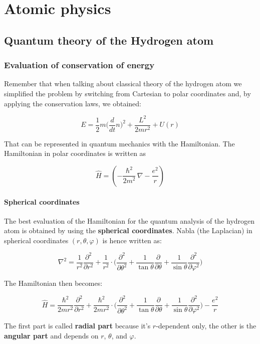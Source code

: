 \graphicspath{{chapters/06/}}
\chapter{Atomic physics}

\section{Quantum theory of the Hydrogen atom}

	\subsection{Evaluation of conservation of energy}
	Remember that when talking about classical theory of the hydrogen atom we simplified the problem by switching from Cartesian to polar coordinates and, by applying the conservation laws, we obtained:

	$$E=\frac{1}{2}m\bigg(\frac{d}{dt}n\bigg)^2+\frac{L^2}{2mr^2}+U(r)$$

	That can be represented in quantum mechanics with the Hamiltonian.
	The Hamiltonian in polar coordinates is written as

	$$\hat{H}=(-\frac{\hbar^2}{2m^2}\, \nabla - \frac{e^2}{r})$$

		\subsubsection{Spherical coordinates}
		The best evaluation of the Hamiltonian for the quantum analysis of the hydrogen atom is obtained by using the \textbf{spherical coordinates}.
		Nabla (the Laplacian) in spherical coordinates $(r,\theta,\varphi)$ is hence written as:

		$$\nabla^2=\frac{1}{r^2}\frac{\partial^2}{\partial r^2}+\frac{1}{r^2}\cdot\bigg(\frac{\partial^2}{\partial \theta^2}+\frac{1}{\tan\theta}\frac{\partial}{\partial\theta}+\frac{1}{\sin\theta}\frac{\partial^2}{\partial\varphi^2}\bigg)$$

		The Hamiltonian then becomes:

		$$\hat{H}=\frac{\hbar^2}{2mr^2}\frac{\partial^2}{\partial r^2}+\frac{\hbar^2}{2mr^2}\cdot\bigg(\frac{\partial^2}{\partial \theta^2}+\frac{1}{\tan\theta}\frac{\partial}{\partial\theta}+\frac{1}{\sin\theta}\frac{\partial^2}{\partial\varphi^2}\bigg)-\frac{e^2}{r}$$

		The first part is called \textbf{radial part} because it's $r$-dependent only, the other is the \textbf{angular part} and depends on $r$, $\theta$, and $\varphi$.

